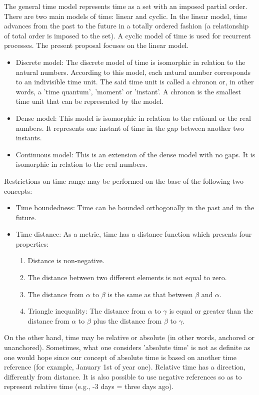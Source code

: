 The general time model represents time as a set with an imposed partial order. There are two main models of time: linear and cyclic. In the linear model, time advances from the past to the future in a totally ordered fashion (a relationship of total order is imposed to the set). A cyclic model of time is used for recurrent processes. The present proposal focuses on the linear model.
\begin{itemize}
\item
Discrete model:  The discrete model of time is isomorphic in relation to the natural numbers. According to this model, each natural number corresponds to an indivisible time unit. The said time unit is called a chronon or, in other words, a 'time quantum', 'moment' or 'instant'. A chronon is the smallest time unit that can be represented by the model.
\item
Dense model: This model is isomorphic in relation to the rational or the real numbers. It represents one instant of time in the gap between another two instants.
\item
Continuous model: This is an extension of the dense model with no gaps. It is isomorphic in relation to the real numbers.
\end{itemize}
Restrictions on time range may be performed on the base of the following two concepts:
\begin{itemize}
\item
Time boundedness: Time can be bounded orthogonally in the past and in the future.
\item
Time distance: As a metric, time has a distance function which presents four properties:
\begin{enumerate}
\item
Distance is non-negative.
\item
The distance between two different elements is not equal to zero.
\item
The distance from $\alpha$ to $\beta$ is the same as that between $\beta$ and $\alpha$.
\item
Triangle inequality: The distance from $\alpha$ to $\gamma$ is equal or greater than the distance from $\alpha$ to $\beta$ plus the distance from $\beta$ to $\gamma$.
\end{enumerate}
\end{itemize}
On the other hand, time may be relative or absolute (in other words, anchored or unanchored). Sometimes, what one considers 'absolute time' is not as definite as one would hope since our concept of absolute time is based on another time reference (for example, January 1st of year one). Relative time has a direction, differently from distance. It is also possible to use negative references so as to represent relative time (e.g., -3 days = three days ago).

